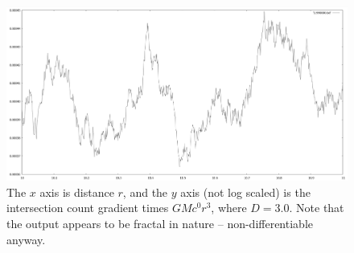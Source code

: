 \documentclass[12pt]{article}
\begin{document}
\begin{figure} 
\centering
  \includegraphics[width = 6 in]{fractal.png}
  \caption{
The $x$ axis is distance $r$, and the $y$ axis (not log scaled) is the intersection count gradient times $GM c^0 r^3$, where $D = 3.0$.
Note that the output appears to be fractal in nature -- non-differentiable anyway.
}
\end{figure}
\end{document}
